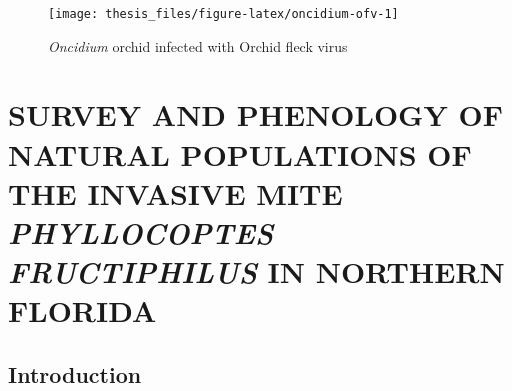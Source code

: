 \documentclass[12pt,final,CPage]{ufthesis}
\begin{document}
{\begin{figure}
  {\centering \texttt{[image: thesis\_files/figure-latex/oncidium-ofv-1]} 

  }

  \caption{\textit{Oncidium} orchid infected with Orchid fleck virus}\label{fig:oncidium-ofv}
  \end{figure}
  \hypertarget{survey-pheno}{%
  \chapter{\texorpdfstring{SURVEY AND PHENOLOGY OF NATURAL POPULATIONS OF THE INVASIVE MITE \emph{PHYLLOCOPTES FRUCTIPHILUS} IN NORTHERN FLORIDA}{SURVEY AND PHENOLOGY OF NATURAL POPULATIONS OF THE INVASIVE MITE PHYLLOCOPTES FRUCTIPHILUS IN NORTHERN FLORIDA}}\label{survey-pheno}}

  \hypertarget{intro-survey-pheno}{%
  \section{Introduction}\label{intro-survey-pheno}}

}
\end{document}
